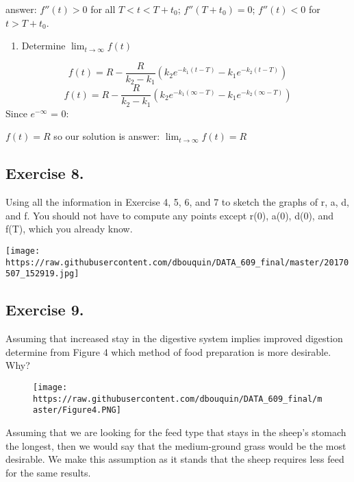 \documentclass[]{article}
\providecommand{\tightlist}{%
  \setlength{\itemsep}{0pt}\setlength{\parskip}{0pt}}
\begin{document}
answer: \(f''(t) > 0\) for all \(T < t < T + t_0\); \(f''(T + t_0) =0\);
\(f''(t) < 0\) for \(t > T + t_0\).

\begin{enumerate}
\def\labelenumi{(\alph{enumi})}
\setcounter{enumi}{2}
\tightlist
\item
  Determine \(\lim_{t\to\infty}f(t)\)
\end{enumerate}

\[f(t) = R - \frac{R}{k_2 - k_1}(k_2 e^{-k_1(t-T)}-k_1 e^{-k_2(t-T)})\]
\[f(t) = R - \frac{R}{k_2 - k_1}(k_2 e^{-k_1(\infty-T)}-k_1 e^{-k_2(\infty-T)})\]
Since \(e^{-\infty}\) = 0:

\(f(t) = R\) so our solution is answer: \(\lim_{t\to\infty}f(t) = R\)

\subsection{Exercise 8.}\label{exercise-8.}

Using all the information in Exercise 4, 5, 6, and 7 to sketch the
graphs of r, a, d, and f. You should not have to compute any points
except r(0), a(0), d(0), and f(T), which you already know.

\texttt{[image: https://raw.githubusercontent.com/dbouquin/DATA\_609\_final/master/20170507\_152919.jpg]}
\newpage

\subsection{Exercise 9.}\label{exercise-9.}

Assuming that increased stay in the digestive system implies improved
digestion determine from Figure 4 which method of food preparation is
more desirable. Why?

\begin{figure}[htbp]
\centering
\texttt{[image: https://raw.githubusercontent.com/dbouquin/DATA\_609\_final/master/Figure4.PNG]}
\caption{}
\end{figure}

Assuming that we are looking for the feed type that stays in the sheep's
stomach the longest, then we would say that the medium-ground grass
would be the most desirable. We make this assumption as it stands that
the sheep requires less feed for the same results.
\end{document}
